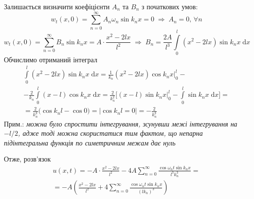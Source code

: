 Залишається визначити коефіцієнти $A_n$ та $B_n$ з початкових умов:
\begin{equation*}
    w_t(x,0) = \sum_{n=0}^{\infty} A_n\omega_n\sin k_nx = 0
    \;\Rightarrow\;
    A_n = 0,\, \forall n
\end{equation*}
\begin{equation*}
    w_t(x,0) = \sum_{n=0}^{\infty} B_n\sin k_nx = A \cdot \frac{x^2 - 2lx}{l^2} 
    \;\Rightarrow\;
    B_n = \frac{2A}{l^3} \int\limits_0^l (x^2 - 2lx) \sin k_nx \;\mathrm{d}x
\end{equation*}
Обчислимо отриманий інтеграл 
\begin{equation*}
    \begin{gathered}
        \int\limits_0^l (x^2 - 2lx) \sin k_nx \;\mathrm{d}x = \frac{1}{k_n} (x^2 - 2lx) \cos k_nx \bigg|_0^l -\\
        - \frac{2}{k_n} \int\limits_0^l (x-l) \cos k_nx \;\mathrm{d}x = \frac{2}{k_n^2} \bigg[(x-l)\sin k_nx \bigg|_0^l - \int\limits_0^l \sin k_nx \;\mathrm{d}x \bigg] =\\
        = \frac{2}{k_n^3} \big(\cos k_nl - \cos 0\big) = \bigg|\cos k_nl = 0\bigg| = -\frac{2}{k_n^3}
    \end{gathered}
\end{equation*}
Прим.: \textit{можна було спростити інтегрування, зсунувши межі інтегрування на $-l/2$, адже тоді можна скористатися тим фактом, що непарна підінтегральна функція по симетричним межам дає нуль}

Отже, розв'язок 
\begin{equation}
    \begin{gathered}
        u(x,t) = - A \cdot \frac{x^2 - 2lx}{l^2} - 4A\sum_{n=0}^{\infty} \frac{\cos\omega_nt \sin k_nx}{l^3k_n^3} =\\
        = -A \left(\frac{x^2 - 2lx}{l^2} + 4\sum_{n=0}^{\infty} \frac{\cos\omega_nt \sin k_nx}{(lk_n)^3}\right)
    \end{gathered}
\end{equation}

%